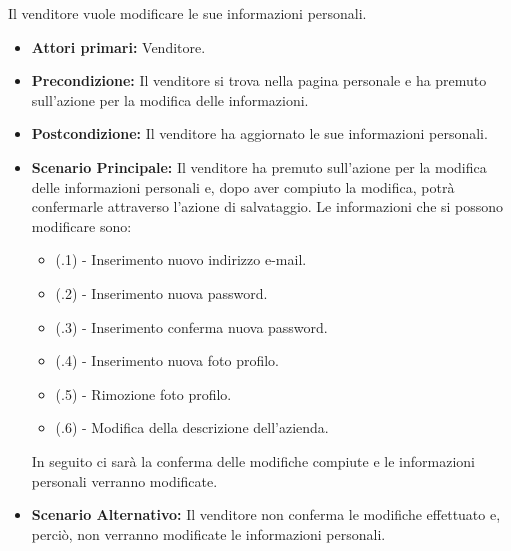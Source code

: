 
Il venditore vuole modificare le sue informazioni personali.
\begin{itemize}
    \item \textbf{Attori primari:} Venditore.
    \item \textbf{Precondizione:} Il venditore si trova nella pagina personale e ha premuto sull'azione per la modifica delle informazioni.
    \item \textbf{Postcondizione:} Il venditore ha aggiornato le sue informazioni personali.
    \item \textbf{Scenario Principale:} Il venditore ha premuto sull'azione per la modifica delle informazioni personali e, dopo aver compiuto la modifica, potrà confermarle attraverso l'azione di salvataggio. Le informazioni che si possono modificare sono:
    \begin{itemize}
        \item (\actualUC.1) - Inserimento nuovo indirizzo e-mail.
        \item (\actualUC.2) - Inserimento nuova password.
        \item (\actualUC.3) - Inserimento conferma nuova password.
        \item (\actualUC.4) - Inserimento nuova foto profilo.
        \item (\actualUC.5) - Rimozione foto profilo.
        \item (\actualUC.6) - Modifica della descrizione dell'azienda.
    \end{itemize}
    In seguito ci sarà la conferma delle modifiche compiute e le informazioni personali verranno modificate.
    \item \textbf{Scenario Alternativo:} Il venditore non conferma le modifiche effettuato e, perciò, non verranno modificate le informazioni personali.
\end{itemize}
\resetSubUC

